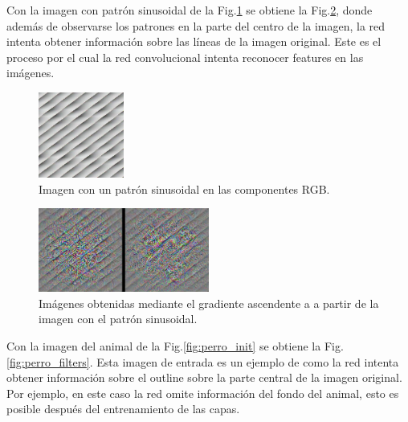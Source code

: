 Con la imagen  con patrón sinusoidal de la Fig.\ref{fig:sin_init} se obtiene la Fig.\ref{fig:sin_filters}, donde además de observarse los  patrones en la parte del centro de la imagen, la red intenta obtener información sobre las líneas de la imagen original. Este es el proceso por el cual la red convolucional intenta reconocer features en las imágenes. 

\begin{figure}[H]
    \begin{small}
        \begin{center}
            \includegraphics[width=0.25\textwidth]{Figs/sin_init_img_epochs_50.pdf}
        \end{center}
        \caption{Imagen con un patrón sinusoidal en las componentes RGB.}
        \label{fig:sin_init}
    \end{small}
\end{figure}

\begin{figure}[H]
    \begin{small}
        \begin{center}
            \includegraphics[width=0.5\textwidth]{Figs/sin_filters_epochs_50.pdf}
        \end{center}
        \caption{Imágenes obtenidas mediante el gradiente ascendente a a partir de la imagen con el patrón sinusoidal.}
        \label{fig:sin_filters}
    \end{small}
\end{figure}

Con la imagen  del animal de la Fig.\ref{fig:perro_init} se obtiene la Fig.\ref{fig:perro_filters}. Esta imagen de entrada es un ejemplo de como la red intenta obtener información sobre el outline sobre la parte  central de la imagen original. Por ejemplo, en este caso la red omite información del fondo del animal, esto es posible después del entrenamiento de las capas.



